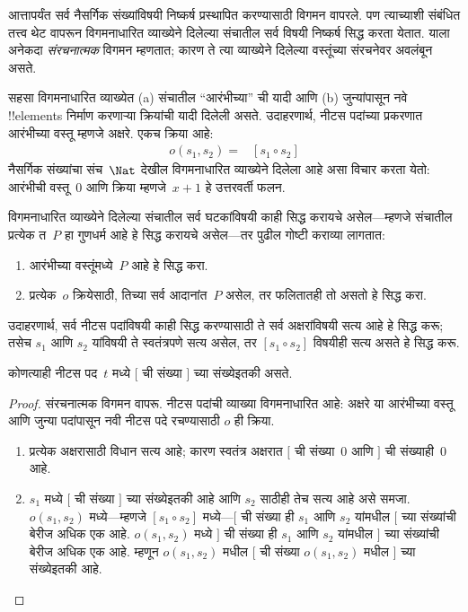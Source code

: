 \documentclass[../../../include/open-logic-section]{subfiles}
\begin{document}


आत्तापर्यंत सर्व नैसर्गिक संख्यांविषयी निष्कर्ष प्रस्थापित करण्यासाठी विगमन वापरले. पण त्याच्याशी संबंधित तत्त्व थेट वापरून विगमनाधारित व्याख्येने दिलेल्या संचातील सर्व विषयी निष्कर्ष सिद्ध करता येतात. याला अनेकदा \emph{संरचनात्मक} विगमन म्हणतात; कारण ते त्या व्याख्येने दिलेल्या वस्तूंच्या संरचनेवर अवलंबून असते.

सहसा विगमनाधारित व्याख्येत (a) संचातील “आरंभीच्या” ची यादी आणि (b) जुन्यांपासून नवे !!{element}s निर्माण करणाऱ्या क्रियांची यादी दिलेली असते. उदाहरणार्थ, नीटस पदांच्या प्रकरणात आरंभीच्या वस्तू म्हणजे अक्षरे. एकच क्रिया आहे:
\begin{align*}
  o(s_1, s_2) = & [s_1 \circ s_2]
\end{align*}
नैसर्गिक संख्यांचा संच~$\Nat$ देखील विगमनाधारित व्याख्येने दिलेला आहे असा विचार करता येतो: आरंभीची वस्तू~$0$ आणि क्रिया म्हणजे~$x + 1$ हे उत्तरवर्ती फलन.

विगमनाधारित व्याख्येने दिलेल्या संचातील सर्व घटकांविषयी काही सिद्ध करायचे असेल---म्हणजे संचातील प्रत्येक त~$P$ हा गुणधर्म आहे हे सिद्ध करायचे असेल---तर पुढील गोष्टी कराव्या लागतात:
\begin{enumerate}
\item आरंभीच्या वस्तूंमध्ये~$P$ आहे हे सिद्ध करा.
\item प्रत्येक~$o$ क्रियेसाठी, तिच्या सर्व आदानांत~$P$ असेल, तर फलितातही तो असतो हे सिद्ध करा.
\end{enumerate}
उदाहरणार्थ, सर्व नीटस पदांविषयी काही सिद्ध करण्यासाठी ते सर्व अक्षरांविषयी सत्य आहे हे सिद्ध करू; तसेच $s_1$ आणि $s_2$ यांविषयी ते स्वतंत्रपणे सत्य असेल, तर $[s_1 \circ s_2]$ विषयीही सत्य असते हे सिद्ध करू.

\begin{prop}
कोणत्याही नीटस पद~$t$ मध्ये $[$ ची संख्या $]$ च्या संख्येइतकी असते.
\end{prop}

\begin{proof}
संरचनात्मक विगमन वापरू. नीटस पदांची व्याख्या विगमनाधारित आहे: अक्षरे या आरंभीच्या वस्तू आणि जुन्या पदांपासून नवी नीटस पदे रचण्यासाठी $o$ ही क्रिया.
\begin{enumerate}
\item प्रत्येक अक्षरासाठी विधान सत्य आहे; कारण स्वतंत्र अक्षरात $[$ ची संख्या~$0$ आणि $]$ ची संख्याही~$0$ आहे.
\item $s_1$ मध्ये $[$ ची संख्या $]$ च्या संख्येइतकी आहे आणि $s_2$ साठीही तेच सत्य आहे असे समजा. $o(s_1, s_2)$ मध्ये---म्हणजे $[s_1 \circ s_2]$ मध्ये---$[$ ची संख्या ही $s_1$ आणि $s_2$ यांमधील $[$ च्या संख्यांची बेरीज अधिक एक आहे. $o(s_1, s_2)$ मध्ये $]$ ची संख्या ही $s_1$ आणि $s_2$ यांमधील $]$ च्या संख्यांची बेरीज अधिक एक आहे. म्हणून $o(s_1, s_2)$ मधील $[$ ची संख्या $o(s_1,s_2)$ मधील $]$ च्या संख्येइतकी आहे.
\end{enumerate}
\end{proof}
\end{document}
